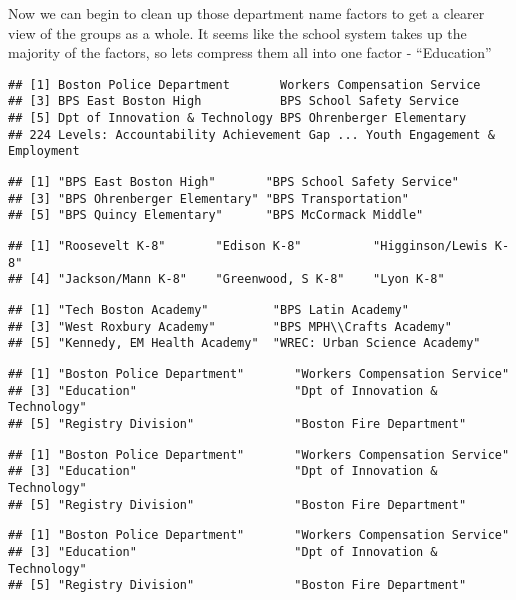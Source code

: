 \documentclass[]{article}
\begin{document}
Now we can begin to clean up those department name factors to get a
clearer view of the groups as a whole. It seems like the school system
takes up the majority of the factors, so lets compress them all into one
factor - ``Education''

\begin{verbatim}
## [1] Boston Police Department       Workers Compensation Service  
## [3] BPS East Boston High           BPS School Safety Service     
## [5] Dpt of Innovation & Technology BPS Ohrenberger Elementary    
## 224 Levels: Accountability Achievement Gap ... Youth Engagement & Employment
\end{verbatim}

\begin{verbatim}
## [1] "BPS East Boston High"       "BPS School Safety Service" 
## [3] "BPS Ohrenberger Elementary" "BPS Transportation"        
## [5] "BPS Quincy Elementary"      "BPS McCormack Middle"
\end{verbatim}

\begin{verbatim}
## [1] "Roosevelt K-8"       "Edison K-8"          "Higginson/Lewis K-8"
## [4] "Jackson/Mann K-8"    "Greenwood, S K-8"    "Lyon K-8"
\end{verbatim}

\begin{verbatim}
## [1] "Tech Boston Academy"         "BPS Latin Academy"          
## [3] "West Roxbury Academy"        "BPS MPH\\Crafts Academy"    
## [5] "Kennedy, EM Health Academy"  "WREC: Urban Science Academy"
\end{verbatim}

\begin{verbatim}
## [1] "Boston Police Department"       "Workers Compensation Service"  
## [3] "Education"                      "Dpt of Innovation & Technology"
## [5] "Registry Division"              "Boston Fire Department"
\end{verbatim}

\begin{verbatim}
## [1] "Boston Police Department"       "Workers Compensation Service"  
## [3] "Education"                      "Dpt of Innovation & Technology"
## [5] "Registry Division"              "Boston Fire Department"
\end{verbatim}

\begin{verbatim}
## [1] "Boston Police Department"       "Workers Compensation Service"  
## [3] "Education"                      "Dpt of Innovation & Technology"
## [5] "Registry Division"              "Boston Fire Department"
\end{verbatim}
\end{document}
